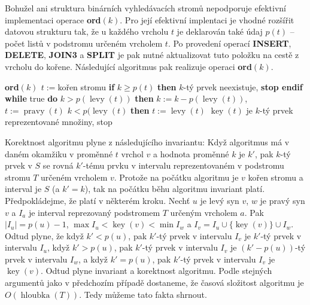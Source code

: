 \documentclass[a4paper,12pt]{article}
\DeclareMathOperator*{\levy}{levy}
\DeclareMathOperator*{\pravy}{pravy}
\DeclareMathOperator*{\key}{key}
\DeclareMathOperator*{\hloubka}{hloubka}
\begin{document}
Bohužel ani struktura binárních vyhledávacích 
stromů nepodporuje efektivní implementaci operace 
{\bf ord$(k)$}. Pro její efektivní implentaci je vhodné rozšířit 
datovou strukturu tak, že u každého vrcholu $t$ je deklarován 
také údaj $p(t)$ -- počet listů v podstromu určeném 
vrcholem $t$. Po provedení operací {\bf INSERT}, {\bf DELETE}, {\bf JOIN3} a 
{\bf SPLIT} je pak nutné aktualizovat tuto položku na cestě z 
vrcholu do kořene. Následující algoritmus pak 
realizuje operaci {\bf ord}$(k)$.

{\bf ord$(k)$ \newline 
$t:=$}kořen stromu \newline 
{\bf if} $k\ge p(t)$ {\bf then} $k$-tý prvek neexistuje, {\bf stop endif\newline 
while} true {\bf do}\newline 
\phantom{---}{\bf if} $k>p(\levy(t))$ {\bf then}\newline 
\phantom{------}$k:=k-p(\levy(t))$, $t:=\pravy(t)$\newline 
\phantom{---}{\bf else}\newline 
\phantom{------}{\bf if} $k<p(\levy(t)$ {\bf then}\newline 
\phantom{---------}$t:=\levy(t)$\newline 
\phantom{------}{\bf else}\newline 
\phantom{---------}$\key(t)$ je $k$-tý prvek reprezentované množiny, stop \newline 
\phantom{------}{\bf endif}\newline 
\phantom{---}{\bf endif\newline 
enddo}

Korektnost algoritmu plyne z následujícího invariantu:  
Když algoritmus má v daném okamžiku v proměnné $t$ vrchol $
v$ 
a hodnota proměnné $k$ je $k'$, pak $k$-tý prvek v $S$ se rovná 
$k'$-tému prvku v intervalu reprezentovaném v podstromu 
stromu $T$ určeném vrcholem $v$.  Protože na počátku algoritmu 
je $v$ kořen stromu a interval je $S$ (a $k'=k$), tak na počátku 
běhu algoritmu invariant platí.  Předpokládejme, že platí v 
některém kroku.  Nechť $u$ je levý syn $v$, $w$ je pravý syn $
v$ a 
$I_a$ je interval reprezovaný podstromem $T$ určeným vrcholem $
a$.  
Pak $|I_u|=p(u)-1$, $\max I_u<\key(v)<\min I_w$ a 
$I_v=I_u\cup \{\key(v)\}\cup I_w$.  Odtud plyne, že když $k'
<p(u)$, pak 
$k'$-tý prvek v intervalu $I_v$ je $k'$-tý prvek v intervalu $
I_u$, když 
$k'>p(u)$, pak $k'$-tý prvek v intervalu $I_v$ je $(k'-p(u))$-tý prvek 
v intervalu $I_w$, a když $k'=p(u)$, pak $k'$-tý prvek v intervalu $
I_v$ 
je $\key(v)$.  Odtud plyne invariant a korektnost algoritmu.  
Podle stejných argumentů jako v předchozím případě 
dostaneme, že časová složitost algoritmu je $O(\hloubka
(T))$.  
Tedy můžeme tato fakta shrnout.  
\end{document}
